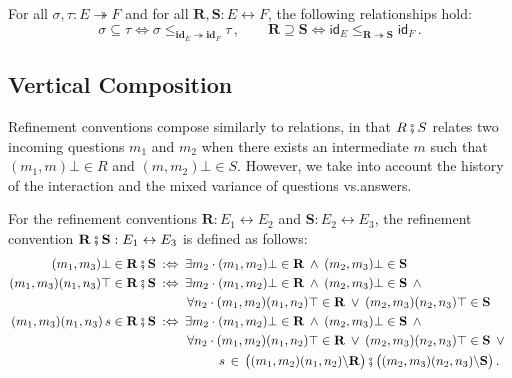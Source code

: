\documentclass[acmsmall,screen,review,anonymous,nonacm]{acmart}
\newcommand{\kw}[1]{\ensuremath{ \mathsf{#1} }}
\newcommand{\idsc}{\mathbf{id}} %
\begin{document}
\begin{theorem}
For all $\sigma, \tau : E \twoheadrightarrow F$ and
for all $\mathbf{R}, \mathbf{S} : E \leftrightarrow F$,
the following relationships hold:
\[
  \sigma \subseteq \tau \Leftrightarrow
  \sigma \le_{\idsc_E \twoheadrightarrow \idsc_F} \tau
  \,,
  \qquad
  \mathbf{R} \supseteq \mathbf{S} \Leftrightarrow
  \kw{id}_E \le_{\mathbf{R} \twoheadrightarrow \mathbf{S}} \kw{id}_F
  \,.
\]
\end{theorem}


\subsection{Vertical Composition} %

Refinement conventions compose similarly to relations,
in that $R \fatsemi S$ relates
two incoming questions $m_1$ and $m_2$
when there exists an intermediate $m$ such that
$(m_1,m)\bot \in R$ and
$(m,m_2)\bot \in S$.
However,
we take into account
the history of the interaction and
the mixed variance of questions vs.\@ answers.

\begin{definition}
For the refinement conventions
$\mathbf{R} : E_1 \leftrightarrow E_2$ and
$\mathbf{S} : E_2 \leftrightarrow E_3$,
the refinement convention
$\mathbf{R \fatsemi S} : E_1 \leftrightarrow E_3$
is defined as follows:
\begin{align*}
  (m_1, m_3) \bot \in \mathbf{R} \fatsemi \mathbf{S} \: :\Leftrightarrow \: {}
   &\exists m_2 \cdot
      (m_1, m_2)\bot \in \mathbf{R} \:\wedge\:
      (m_2, m_3)\bot \in \mathbf{S}
  \\%
  (m_1, m_3) (n_1, n_3) \top \in \mathbf{R} \fatsemi \mathbf{S} \::\Leftrightarrow\: {}
   &\exists m_2 \cdot
      (m_1, m_2)\bot \in \mathbf{R} \:\wedge\:
      (m_2, m_3)\bot \in \mathbf{S} \:\wedge\: {} \\
   &\,\forall n_2 \cdot
      (m_1, m_2)(n_1, n_2)\top \in \mathbf{R} \:\vee\:
      (m_2, m_3)(n_2, n_3)\top \in \mathbf{S}
  \\%
  (m_1, m_3) (n_1, n_3) \, s \in \mathbf{R} \fatsemi \mathbf{S} \::\Leftrightarrow\: {}
   &\exists m_2 \cdot
      (m_1, m_2)\bot \in \mathbf{R} \:\wedge\:
      (m_2, m_3)\bot \in \mathbf{S} \:\wedge\: {} \\
   &\,\forall n_2 \cdot
      (m_1, m_2)(n_1, n_2)\top \in \mathbf{R} \:\vee\:
      (m_2, m_3)(n_2, n_3)\top \in \mathbf{S} \:\vee\: {} \\
   &\qquad \:\:\: s \,\in\,
      \bigl( (m_1, m_2) (n_1, n_2) \backslash \mathbf{R} \bigr) \fatsemi
      \bigl( (m_2, m_3) (n_2, n_3) \backslash \mathbf{S} \bigr)
  \,.
\end{align*}
\end{definition}
\end{document}
